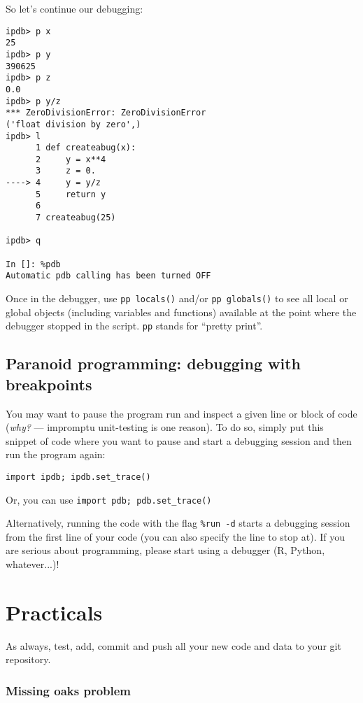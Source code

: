 So let's continue our debugging:
  
\begin{lstlisting}
ipdb> p x
25
ipdb> p y
390625
ipdb> p z
0.0
ipdb> p y/z
*** ZeroDivisionError: ZeroDivisionError
('float division by zero',)
ipdb> l
      1 def createabug(x):
      2     y = x**4
      3     z = 0.
----> 4     y = y/z
      5     return y
      6 
      7 createabug(25)

ipdb> q

In []: %pdb
Automatic pdb calling has been turned OFF
  \end{lstlisting}

\begin{tipbox}
	Once in the debugger, use {\tt pp locals()} and/or {\tt pp globals()} to 
	see all local or global objects (including variables and functions) 
	available at the point where the debugger stopped in the 
	script. {\tt pp} stands for ``pretty print''. 
\end{tipbox}

\subsection{Paranoid programming: debugging with breakpoints}

You may want to pause the program run and inspect a given line or block 
of code ({\it why?} --- impromptu unit-testing is one reason). To do 
so, simply put this snippet of code where you want to pause and start a 
debugging session and then run the program again:
  
\begin{lstlisting}
import ipdb; ipdb.set_trace()
\end{lstlisting}

Or, you can use {\tt import pdb; pdb.set\_trace()}

Alternatively, running the code with the flag {\tt \%run -d} starts a 
debugging session from the first line of your code (you can also 
specify the line to stop at). If you are serious about programming, 
please start using a debugger (R, Python, whatever...)!

\section{Practicals}
As always, test, add, commit and push all your new code and data to 
your git repository. 

\subsubsection{Missing oaks problem}

